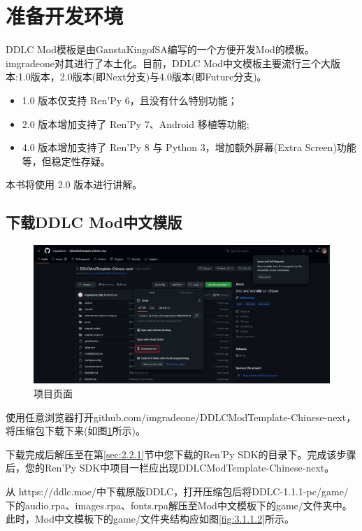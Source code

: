 \section{准备开发环境}
DDLC Mod模板是由GanstaKingofSA编写的一个方便开发Mod的模板。imgradeone对其进行了本土化。目前，DDLC Mod中文模板主要流行三个大版本:1.0版本，2.0版本(即Next分支)与4.0版本(即Future分支)。
\begin{itemize}
    \item 1.0 版本仅支持 Ren'Py 6，且没有什么特别功能；
    \item 2.0 版本增加支持了 Ren'Py 7、Android 移植等功能;
    \item 4.0 版本增加支持了 Ren'Py 8 与 Python 3，增加额外屏幕(Extra Screen)功能等，但稳定性存疑。
\end{itemize}

本书将使用 2.0 版本进行讲解。

\subsection{下载DDLC Mod中文模版}

\begin{figure}[htb]
    \centering
    \includegraphics[scale=.15]{Pictures/2/2.1/2.1.1}
    \caption{项目页面}
    \label{fig:3.1.1.1}
\end{figure}
使用任意浏览器打开github.com/imgradeone/DDLCModTemplate-Chinese-next，将压缩包下载下来(如图\ref{fig:3.1.1.1}所示)。

下载完成后解压至在第\ref{sec:2.2.1}节中您下载的Ren'Py SDK的目录下。完成该步骤后，您的Ren'Py SDK中项目一栏应出现DDLCModTemplate-Chinese-next。

从 https://ddlc.moe/中下载原版DDLC，打开压缩包后将DDLC-1.1.1-pc/game/下的audio.rpa、images.rpa、fonts.rpa解压至Mod中文模板下的game/文件夹中。此时，Mod中文模板下的game/文件夹结构应如图\ref{fig:3.1.1.2}所示。

